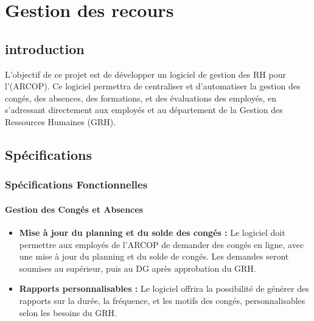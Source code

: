 
\section{Gestion des recours}
\subsection{introduction}

L'objectif de ce projet est de développer un logiciel de gestion des \ac{RH} pour l'(\ac{ARCOP}). Ce logiciel permettra de centraliser et d'automatiser la gestion des congés, des absences, des formations, et des évaluations des employés, en s'adressant directement aux employés et au département de la Gestion des Ressources Humaines (GRH).
\subsection{Spécifications}
\subsubsection{Spécifications Fonctionnelles}


\paragraph{Gestion des Congés et Absences}
\begin{itemize}
    \item \textbf{Mise à jour du planning et du solde des congés :} Le logiciel doit permettre aux employés de l'\ac{ARCOP} de demander des congés en ligne, avec une mise à jour du planning et du solde de congés. Les demandes seront soumises au supérieur, puis au DG après approbation du GRH.

    
    \item \textbf{Rapports personnalisables :} Le logiciel offrira la possibilité de générer des rapports sur la durée, la fréquence, et les motifs des congés, personnalisables selon les besoins du GRH.
    

    
  
\end{itemize}

